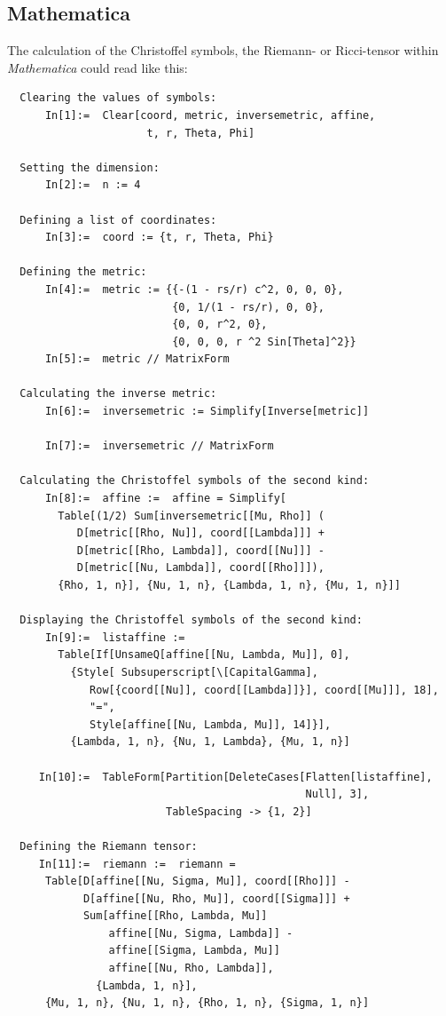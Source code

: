 \documentclass[10pt,twoside,notitlepage,a4paper,fleqn,openbib]{report}
\newcommand{\verbfont}{\fontsize{7}{9}\selectfont}
\begin{document}
\subsection{Mathematica}
The calculation of the Christoffel symbols, the Riemann- or Ricci-tensor within {\sl Mathematica} could read like this:
{\verbfont
\begin{verbatim}
  Clearing the values of symbols:
      In[1]:=  Clear[coord, metric, inversemetric, affine, 
                      t, r, Theta, Phi]

  Setting the dimension:
      In[2]:=  n := 4

  Defining a list of coordinates:
      In[3]:=  coord := {t, r, Theta, Phi}

  Defining the metric:
      In[4]:=  metric := {{-(1 - rs/r) c^2, 0, 0, 0}, 
                          {0, 1/(1 - rs/r), 0, 0}, 
                          {0, 0, r^2, 0}, 
                          {0, 0, 0, r ^2 Sin[Theta]^2}}
      In[5]:=  metric // MatrixForm

  Calculating the inverse metric:
      In[6]:=  inversemetric := Simplify[Inverse[metric]]
    
      In[7]:=  inversemetric // MatrixForm

  Calculating the Christoffel symbols of the second kind:
      In[8]:=  affine :=  affine = Simplify[
        Table[(1/2) Sum[inversemetric[[Mu, Rho]] (
           D[metric[[Rho, Nu]], coord[[Lambda]]] + 
           D[metric[[Rho, Lambda]], coord[[Nu]]] - 
           D[metric[[Nu, Lambda]], coord[[Rho]]]), 
        {Rho, 1, n}], {Nu, 1, n}, {Lambda, 1, n}, {Mu, 1, n}]]

  Displaying the Christoffel symbols of the second kind:
      In[9]:=  listaffine := 
        Table[If[UnsameQ[affine[[Nu, Lambda, Mu]], 0], 
          {Style[ Subsuperscript[\[CapitalGamma], 
             Row[{coord[[Nu]], coord[[Lambda]]}], coord[[Mu]]], 18],
             "=", 
             Style[affine[[Nu, Lambda, Mu]], 14]}], 
          {Lambda, 1, n}, {Nu, 1, Lambda}, {Mu, 1, n}]

     In[10]:=  TableForm[Partition[DeleteCases[Flatten[listaffine], 
                                               Null], 3], 
                         TableSpacing -> {1, 2}]

  Defining the Riemann tensor:
     In[11]:=  riemann :=  riemann = 
      Table[D[affine[[Nu, Sigma, Mu]], coord[[Rho]]] - 
            D[affine[[Nu, Rho, Mu]], coord[[Sigma]]] + 
            Sum[affine[[Rho, Lambda, Mu]]
                affine[[Nu, Sigma, Lambda]] - 
                affine[[Sigma, Lambda, Mu]] 
                affine[[Nu, Rho, Lambda]], 
              {Lambda, 1, n}], 
      {Mu, 1, n}, {Nu, 1, n}, {Rho, 1, n}, {Sigma, 1, n}]


\end{verbatim}}
\end{document}
